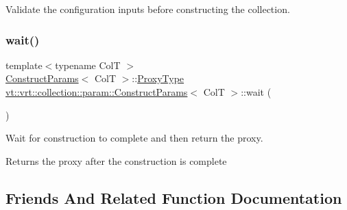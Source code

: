 Validate the configuration inputs before constructing the collection. 

\mbox{\label{structvt_1_1vrt_1_1collection_1_1param_1_1_construct_params_adc5b2150526c86cb3ce556f7cd865a0c}} 
\subsubsection{\texorpdfstring{wait()}{wait()}}
{\footnotesize\ttfamily template$<$typename ColT $>$ \\
\hyperlink{structvt_1_1vrt_1_1collection_1_1param_1_1_construct_params}{Construct\+Params}$<$ ColT $>$\+::\hyperlink{structvt_1_1vrt_1_1collection_1_1param_1_1_construct_params_a837fb2b2a036f898fb65da72d3ee2fb0}{Proxy\+Type} \hyperlink{structvt_1_1vrt_1_1collection_1_1param_1_1_construct_params}{vt\+::vrt\+::collection\+::param\+::\+Construct\+Params}$<$ ColT $>$\+::wait (\begin{DoxyParamCaption}{ }\end{DoxyParamCaption})}



Wait for construction to complete and then return the proxy. 

\begin{DoxyReturn}{Returns}
the proxy after the construction is complete 
\end{DoxyReturn}


\subsection{Friends And Related Function Documentation}
\mbox{\label{structvt_1_1vrt_1_1collection_1_1param_1_1_construct_params_a5953d04785ee9f3eeaab29a45a012076}} 

